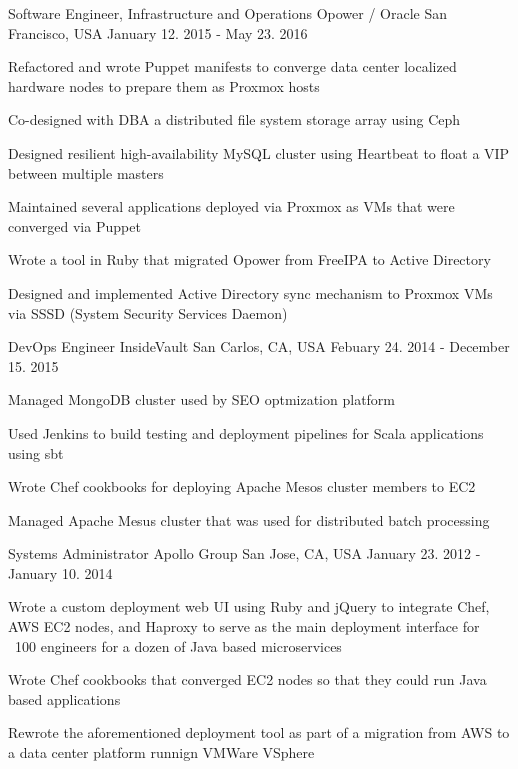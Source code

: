 \begin{cventries}
  \cventry
    {Software Engineer, Infrastructure and Operations} %
    {Opower / Oracle} %
    {San Francisco, USA} %
    {January 12. 2015 - May 23. 2016} %
    {
      \begin{cvitems} %
        \item {Refactored and wrote Puppet manifests to converge data center localized hardware nodes to prepare them as Proxmox hosts}
        \item {Co-designed with DBA a distributed file system storage array using Ceph}
        \item {Designed resilient high-availability MySQL cluster using Heartbeat to float a VIP between multiple masters}
        \item {Maintained several applications deployed via Proxmox as VMs that were converged via Puppet}
        \item {Wrote a tool in Ruby that migrated Opower from FreeIPA to Active Directory}
        \item {Designed and implemented Active Directory sync mechanism to Proxmox VMs via SSSD (System Security Services Daemon)}
      \end{cvitems}
    }

  \cventry
    {DevOps Engineer} %
    {InsideVault} %
    {San Carlos, CA, USA} %
    {Febuary 24. 2014 - December 15. 2015} %
    {
      \begin{cvitems}
        \item {Managed MongoDB cluster used by SEO optmization platform}
        \item {Used Jenkins to build testing and deployment pipelines for Scala applications using sbt}
        \item {Wrote Chef cookbooks for deploying Apache Mesos cluster members to EC2}
        \item {Managed Apache Mesus cluster that was used for distributed batch processing}
      \end{cvitems}
    }
  \cventry
    {Systems Administrator} %
    {Apollo Group} %
    {San Jose, CA, USA} %
    {January 23. 2012 - January 10. 2014} %
    {
      \begin{cvitems} %
        \item {Wrote a custom deployment web UI using Ruby and jQuery to integrate Chef, AWS EC2 nodes, and Haproxy to serve as the main deployment interface for ~100 engineers for a dozen of Java based microservices}
        \item {Wrote Chef cookbooks that converged EC2 nodes so that they could run Java based applications}
        \item {Rewrote the aforementioned deployment tool as part of a migration from AWS to a data center platform runnign VMWare VSphere}
      \end{cvitems}
    }
\end{cventries}
